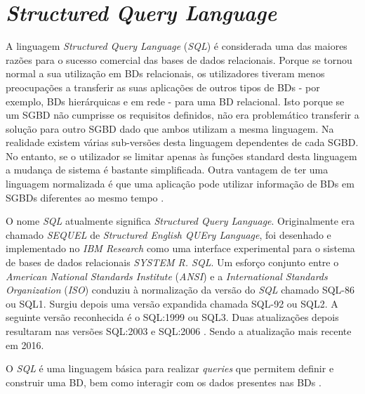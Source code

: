 \documentclass[11pt,twoside,a4paper]{report}
\begin{document}
\section{\textit{Structured Query Language}}
\label{subchap:sql}
A linguagem \textit{Structured Query Language} (\textit{SQL}) é considerada uma das maiores razões para o sucesso comercial das bases de dados relacionais. Porque se tornou normal a sua utilização em BDs relacionais, os utilizadores tiveram menos preocupações a transferir as suas aplicações de outros tipos de BDs - por exemplo, BDs hierárquicas e em rede - para uma BD relacional. Isto porque se um SGBD não cumprisse os requisitos definidos, não era problemático transferir a solução para outro SGBD dado que ambos utilizam a mesma linguagem. Na realidade existem várias sub-versões desta linguagem dependentes de cada SGBD. No entanto, se o utilizador se limitar apenas às funções standard desta linguagem a mudança de sistema é bastante simplificada. Outra vantagem de ter uma linguagem normalizada é que uma aplicação pode utilizar informação de BDs em SGBDs diferentes ao mesmo tempo \cite{Elmasri:2010:FDS:1855347}.\par 
O nome \textit{SQL} atualmente significa \textit{Structured Query Language}. Originalmente era chamado \textit{SEQUEL} de \textit{Structured English QUEry Language}, foi desenhado e implementado no \textit{IBM Research} como uma interface experimental para o sistema de bases de dados relacionais \textit{SYSTEM R. SQL}. Um esforço conjunto entre o \textit{American National Standards Institute} (\textit{ANSI}) e a \textit{International Standards Organization} (\textit{ISO}) conduziu à normalização da versão do \textit{SQL} chamado SQL-86 ou SQL1. Surgiu depois uma versão expandida chamada SQL-92 ou SQL2. A seguinte versão reconhecida é o SQL:1999 ou SQL3. Duas atualizações depois resultaram nas versões SQL:2003 e SQL:2006  \cite{Elmasri:2010:FDS:1855347}. Sendo a atualização mais recente em 2016.\par 
O \textit{SQL} é uma linguagem básica para realizar \textit{queries} que permitem definir e construir uma BD, bem como interagir com os dados presentes nas BDs \cite{Elmasri:2010:FDS:1855347}.
\end{document}
